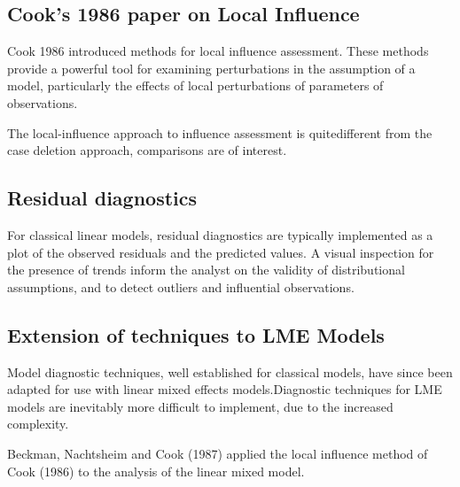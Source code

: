 \documentclass[12pt, a4paper]{article}
\begin{document}
\subsection{Cook's 1986 paper on Local Influence}%
Cook 1986 introduced methods for local influence assessment. These methods provide a powerful tool for examining perturbations in the assumption of a model, particularly the effects of local perturbations of parameters of observations.


The local-influence approach to influence assessment is quitedifferent from the case deletion approach, comparisons are of
interest.


			
			

			
			\subsection{Residual diagnostics} %
			For classical linear models, residual diagnostics are typically implemented as a plot of the observed residuals and the predicted values. A visual inspection for the presence of trends inform the analyst on the validity of distributional assumptions, and to detect outliers and influential observations.
			
			
			\subsection*{Extension of techniques to LME Models} %
			
			Model diagnostic techniques, well established for classical models, have since been adapted for use with linear mixed effects models.Diagnostic techniques for LME models are inevitably more difficult to implement, due to the increased complexity.
			
			Beckman, Nachtsheim and Cook (1987)  applied the local influence method of Cook (1986) to the analysis of the linear mixed model.
			
\end{document}
